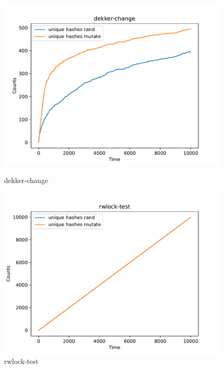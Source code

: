 \begin{figure}[H]
    \centering
        \begin{minipage}{0.45\textwidth}
            \centering
            \includegraphics[width=\textwidth]{figure/dekker-change.pdf}
            \caption{dekker-change}
            \label{cover-plot1-dekker-change}
        \end{minipage}
        \hfill
        \begin{minipage}{0.45\textwidth}
            \centering
            \includegraphics[width=\textwidth]{figure/rwlock-test.pdf}
            \caption{rwlock-test}
            \label{cover-plot1-rwlock-test}
        \end{minipage}


\end{figure}
